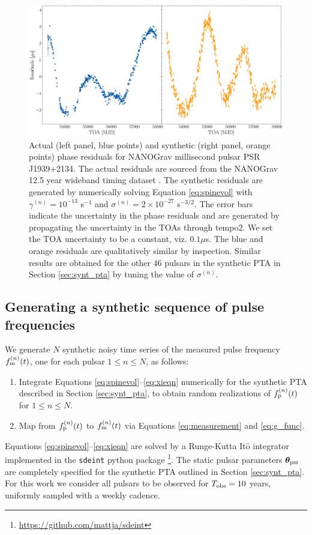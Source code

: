 \documentclass[fleqn,usenatbib,useAMS]{mnras}
\begin{document}
\begin{figure}
	\includegraphics[width=\columnwidth]{images/example_residuals_plot2}
	\caption{Actual (left panel, blue points) and synthetic (right panel, orange points) phase residuals for NANOGrav millisecond pulsar PSR J1939+2134. The actual residuals are sourced from the NANOGrav 12.5 year wideband timing dataset \citep{pennucci_timothy_t_2020_4312887,nanogravwideband}. The synthetic residuals are generated by numerically solving Equation \eqref{eq:spinevol} with $\gamma^{(n)} = 10^{-13}$ s$^{-1}$ and $\sigma^{(n)} = 2\times 10^{-27}$ s$^{-3/2}$. The error bars indicate the uncertainty in the phase residuals and are generated by propagating the uncertainty in the TOAs through {\sc tempo2}. We set the TOA uncertainty to be a constant, viz. $0.1 \mu$s. The blue and orange residuals are qualitatively similar by inspection. Similar results are obtained for the other 46 pulsars in the synthetic PTA in Section \ref{sec:synt_pta} by tuning the value of $\sigma^{(n)}$.}
	\label{fig:qualitative_compare}
\end{figure}
\subsection{Generating a synthetic sequence of pulse frequencies}\label{sec:gendata}
We generate $N$ synthetic noisy time series of the measured pulse frequency $f_{\rm m}^{(n)}(t)$, one for each pulsar $1\leq n \leq N$, as follows:
\begin{enumerate}[leftmargin=2em]
	\item Integrate Equations \eqref{eq:spinevol}--\eqref{eq:xieqn} numerically for the synthetic PTA described in Section \ref{sec:synt_pta}, to obtain random realizations of $f_{\rm p}^{(n)}(t)$ for $1\leq n \leq N$.
	\item Map from $f_{\rm p}^{(n)}(t)$ to $f_{\rm m}^{(n)}(t)$ via Equations \eqref{eq:measurement} and \eqref{eq:g_func}.
\end{enumerate}
Equations \eqref{eq:spinevol}--\eqref{eq:xieqn} are solved by a Runge-Kutta It$\hat{\text{o}}$ integrator implemented in the \texttt{sdeint} python package \footnote{\url{https://github.com/mattja/sdeint}}. The static pulsar parameters  $\boldsymbol{\theta}_{\rm psr}$ are completely specified for the synthetic PTA outlined in Section \ref{sec:synt_pta}. For this work we consider all pulsars to be observed for $T_{\rm obs} =10$ years, uniformly sampled with a weekly cadence. \newline 
\end{document}

